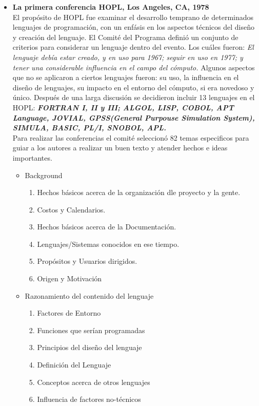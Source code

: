 \documentclass{article}
\begin{document}
\begin{itemize}
	\item \textbf{La primera conferencia HOPL, Los Angeles, CA, 1978} \\ El propósito de HOPL fue examinar el desarrollo temprano de determinados lenguajes de programación, con un enfásis en los aspectos técnicos del diseño y creación del lenguaje. El Comité del Programa definió un conjunto de criterios para considerar un lenguaje dentro del evento. Los cuáles fueron: \textit{El lenguaje debía estar creado, y en uso para 1967; seguir en uso en 1977; y tener una considerable influencia en el campo del cómputo.} Algunos aspectos que no se aplicaron a ciertos lenguajes fueron: su uso, la influencia en el diseño de lenguajes, su impacto en el entorno del cómputo, si era novedoso y único. Después de una larga discusión se decidieron incluir 13 lenguajes en el HOPL: \textit{\textbf{FORTRAN I, II y III; ALGOL, LISP, COBOL, APT Language, JOVIAL, GPSS(General Purpouse Simulation System), SIMULA, BASIC, PL/I, SNOBOL, APL.}}
	\\Para realizar las conferencias el comité seleccionó 82 temas especificos para guiar a los autores a realizar un buen texto y atender hechos e ideas importantes. 
	\begin{itemize}
		\item Background
		\begin{enumerate}
			\item Hechos básicos acerca de la organización dle proyecto y la gente.
			\item Costos y Calendarios.
			\item Hechos básicos acerca de la Documentación.
			\item Lenguajes/Sistemas conocidos en ese tiempo.
			\item Propósitos y Usuarios dirigidos. 
			\item Origen y Motivación
		\end{enumerate}
		\item Razonamiento del contenido del lenguaje
		\begin{enumerate}
			\item Factores de Entorno
			\item Funciones que serían programadas
			\item Principios del diseño del lenguaje
			\item Definición del Lenguaje
			\item Conceptos acerca de otros lenguajes
			\item Influencia de factores no-técnicos
		\end{enumerate}

\end{itemize}
\end{itemize}
\end{document}
